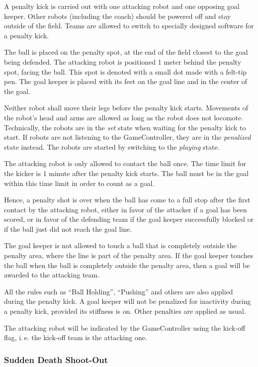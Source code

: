 \documentclass[12pt]{article}
\newcommand{\ie}{\mbox{i.\,e.}\xspace}
\begin{document}
A penalty kick is carried out with one attacking robot and one opposing goal keeper. Other robots (including the coach) should be powered off and stay outside of the field. Teams are allowed to switch to specially designed software for a penalty kick. 

The ball is placed on the penalty spot, at the end of the field closest to the goal being defended. The attacking robot is positioned 1 meter behind the penalty spot, facing the ball.  This spot is denoted with a small dot made with a felt-tip pen. The goal keeper is placed with its feet on the goal line and in the center of the goal.

Neither robot shall move their legs before the penalty kick starts. Movements of the robot's head and arms are allowed as long as the robot does not locomote. Technically, the robots are in the \emph{set} state when waiting for the penalty kick to start. If robots are not listening to the GameController, they are in the \emph{penalized} state instead. The robots are started by switching to the \emph{playing} state.

The attacking robot is only allowed to contact the ball once.  The time limit for the kicker is 1 minute after the penalty kick starts. The ball must be in the goal within this time limit in order to count as a goal.

Hence, a penalty shot is over when the ball has come to a full stop after the first contact by the attacking robot, either in favor of the attacker if a goal has been scored, or in favor of the defending team if the goal keeper successfully blocked or if the ball just did not reach the goal line.

The goal keeper is not allowed to touch a ball that is completely outside the penalty area, where the line is part of the penalty area. If the goal keeper touches the ball when the ball is completely outside the penalty area, then a goal will be awarded to the attacking team.

All the rules such as ``Ball Holding'', ``Pushing'' and others are also applied during the penalty kick.  A goal keeper will not be penalized for inactivity during a penalty kick, provided its stiffness is on. Other penalties are applied as usual.

The attacking robot will be indicated by the GameController using the kick-off flag, \ie the kick-off team is the attacking one.

\subsubsection{Sudden Death Shoot-Out}
\end{document}
